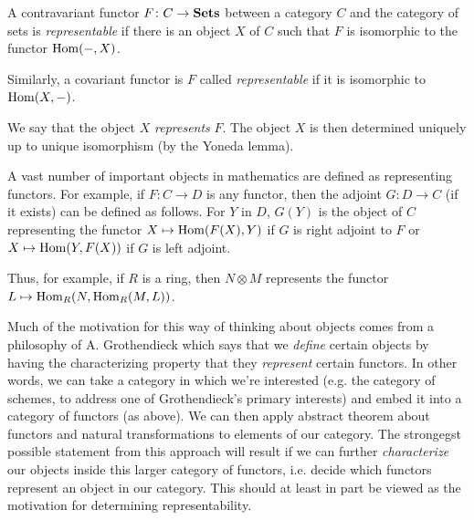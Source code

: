 \documentclass[12pt]{article}
\begin{document}

A contravariant functor $F \colon C \to {\bf Sets}$ between a category $C$ and the category of sets is {\em representable} if there is an object $X$ of $C$ such that $F$ is isomorphic to the functor ${\rm Hom}(-,X)$.

Similarly, a covariant functor is $F$ called {\em representable} if it is isomorphic to ${\rm Hom}(X,-)$.

We say that the object $X$ {\em represents} $F$.  The object $X$ is then determined uniquely up to unique isomorphism (by the Yoneda lemma).

A vast number of important objects in mathematics are defined as representing functors.  For example, if $F\colon C\to D$ is any functor, then the adjoint $G\colon D\to C$ (if it exists) can be defined as follows.  For $Y$ in $D$, $G(Y)$ is the object of $C$ representing the functor $X\mapsto {\rm Hom}(F(X),Y)$ if $G$ is right adjoint to $F$ or $X\mapsto {\rm Hom}(Y,F(X))$ if $G$ is left adjoint.

Thus, for example, if $R$ is a ring, then $N\otimes M$ represents the functor $L\mapsto {\rm Hom}_R(N,{\rm Hom}_R(M,L))$.

Much of the motivation for this way of thinking about objects comes from a philosophy of A. Grothendieck which says that we \emph{define} certain objects by having the characterizing property that they \emph{represent} certain functors.  In other words, we can take a category in which we're interested (e.g. the category of schemes, to address one of Grothendieck's primary interests) and embed it into a category of functors (as above).  We can then apply abstract theorem about functors and natural transformations to elements of our category. The strongegst possible statement from this approach will result if we can further \emph{characterize} our objects inside this larger category of functors, i.e. decide which functors represent an object in our category.  This should at least in part be viewed as the motivation for determining representability.
\end{document}

